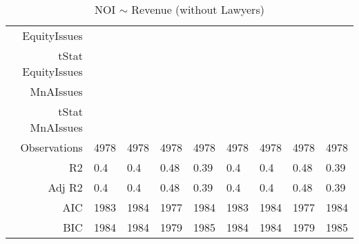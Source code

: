 \begin{table}[ht]
\begin{tabular}{rllllllll}
  EquityIssues &  &  &  &  &  &  &  &  \\ 
  tStat EquityIssues &  &  &  &  &  &  &  &  \\ 
  MnAIssues &  &  &  &  &  &  &  &  \\ 
  tStat MnAIssues &  &  &  &  &  &  &  &  \\ 
  Observations & 4978 & 4978 & 4978 & 4978 & 4978 & 4978 & 4978 & 4978 \\ 
  R2 & 0.4 & 0.4 & 0.48 & 0.39 & 0.4 & 0.4 & 0.48 & 0.39 \\ 
  Adj R2 & 0.4 & 0.4 & 0.48 & 0.39 & 0.4 & 0.4 & 0.48 & 0.39 \\ 
  AIC & 1983 & 1984 & 1977 & 1984 & 1983 & 1984 & 1977 & 1984 \\ 
  BIC & 1984 & 1984 & 1979 & 1985 & 1984 & 1984 & 1979 & 1985 \\ 
   \hline
\end{tabular}
\caption{NOI $\sim$ Revenue (without Lawyers)} 
\end{table}
